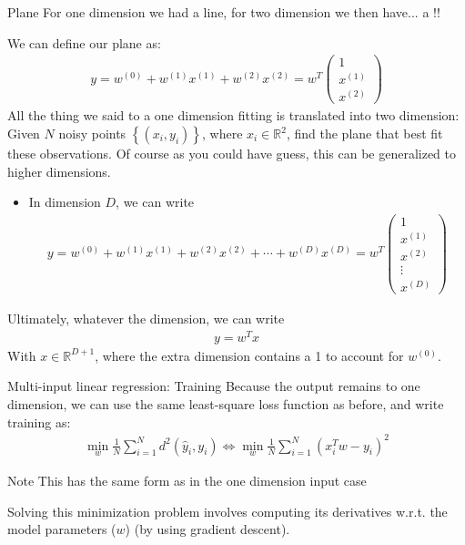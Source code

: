 

\begin{parag}{Plane}
    For one dimension we had a line, for two dimension we then have... a !!

	We can define our plane as:
	\begin{align*} y = w^{\left(0\right)} + w^{\left(1\right)}x^{\left(1\right)} + w^{\left(2\right)}x^{\left(2\right)} = w^{T}\begin{pmatrix} 1 \\ x^{\left(1\right)} \\ x^{\left(2\right)} \end{pmatrix}  \end{align*}
	All the thing we said to a one dimension fitting is translated into two dimension: Given $N$ noisy points $\left\{\left(x_i, y_i\right)\right\}$, where $x_i \in \mathbb{R}^2$, find the plane that best fit these observations. Of course as you could have guess, this can be generalized to higher dimensions.
	\begin{itemize}
		\item In dimension $D$, we can write
			\begin{align*} 
				y = w^{\left(0\right)} + w^{\left(1\right)}x^{\left(1\right)} + w^{\left(2\right)}x^{\left(2\right)} + \cdots + w^{\left(D\right)}x^{\left(D\right)} =  w^{T}\begin{pmatrix} 1 \\ x^{\left(1\right)} \\ x^{\left(2\right)} \\ \vdots \\ x^{\left(D\right)} \end{pmatrix} 
			\end{align*}
	\end{itemize}
	Ultimately, whatever the dimension, we can write
	\begin{align*} y = w^{T}x \end{align*}
	With $x \in \mathbb{R}^{D + 1}$, where the extra dimension contains a 1 to account for $w^{\left(0\right)}$.
	
\end{parag}




\begin{parag}{Multi-input linear regression: Training}
    Because the output remains to one dimension, we can use the same least-square loss function as before, and write training as:
	\begin{align*} \min_w \frac{1}{N}\sum_{i=  1}^{N}d^2\left(\hat{y}_i, y_i\right) \iff \min_w \frac{1}{N}\sum_{i = 1}^{N}\left(x_i^{T}w - y_i\right)^2 \end{align*}
	\begin{subparag}{Note}
	    This has the same form as in the one dimension input case
	\end{subparag}
	Solving this minimization problem involves computing its derivatives w.r.t. the model parameters ($w$) (by using gradient descent).
\end{parag}

